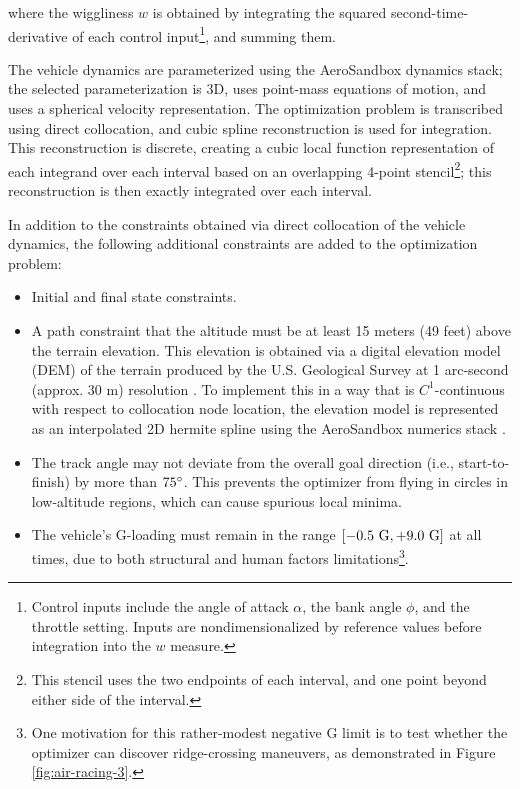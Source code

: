 \noindent where the wiggliness $w$ is obtained by integrating the squared second-time-derivative of each control input\footnote{Control inputs include the angle of attack $\alpha$, the bank angle $\phi$, and the throttle setting. Inputs are nondimensionalized by reference values before integration into the $w$ measure.}, and summing them.

The vehicle dynamics are parameterized using the AeroSandbox dynamics stack; the selected parameterization is 3D, uses point-mass equations of motion, and uses a spherical velocity representation. The optimization problem is transcribed using direct collocation, and cubic spline reconstruction is used for integration. This reconstruction is discrete, creating a cubic local function representation of each integrand over each interval based on an overlapping 4-point stencil\footnote{This stencil uses the two endpoints of each interval, and one point beyond either side of the interval.}; this reconstruction is then exactly integrated over each interval.

In addition to the constraints obtained via direct collocation of the vehicle dynamics, the following additional constraints are added to the optimization problem:
\begin{itemize}
    \item Initial and final state constraints.
    \item A path constraint that the altitude must be at least 15 meters (49 feet) above the terrain elevation. This elevation is obtained via a digital elevation model (DEM) of the terrain produced by the U.S. Geological Survey at 1 arc-second (approx. 30 m) resolution \cite{usgs_2022_dem}. To implement this in a way that is $C^1$-continuous with respect to collocation node location, the elevation model is represented as an interpolated 2D hermite spline using the AeroSandbox numerics stack \cite{sharpe_core_2022}.
    \item The track angle may not deviate from the overall goal direction (i.e., start-to-finish) by more than $75\degree$. This prevents the optimizer from flying in circles in low-altitude regions, which can cause spurious local minima.
    \item The vehicle's G-loading must remain in the range $[{-0.5\ \rm G}, {+9.0\ \rm G}]$ at all times, due to both structural and human factors limitations\footnote{One motivation for this rather-modest negative G limit is to test whether the optimizer can discover ridge-crossing maneuvers, as demonstrated in Figure \ref{fig:air-racing-3}.}.
\end{itemize}

